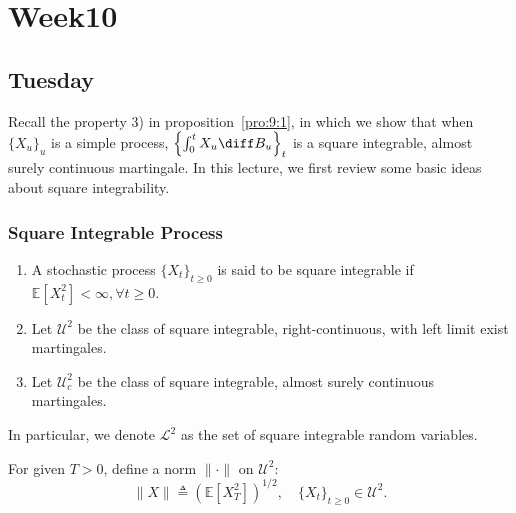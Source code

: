 
\chapter{Week10}

\section{Tuesday}

Recall the property 3) in proposition~\ref{pro:9:1}, in which we show that when $\{X_u\}_u$ is a simple process, $\left\{\int_0^tX_u\diff B_u\right\}_t$ is a square integrable, almost surely continuous martingale.
In this lecture, we first review some basic ideas about square integrability.
\subsection{Square Integrable Process}
\begin{definition}
\begin{enumerate}
\item
A stochastic process $\{X_t\}_{t\ge0}$ is said to be square integrable if 
$\mathbb{E}[X_t^2]<\infty,\forall t\ge0$.
\item
Let $\mathcal{U}^2$ be the class of square integrable, right-continuous, with left limit exist martingales.
\item
Let $\mathcal{U}_c^2$ be the class of square integrable, almost surely continuous martingales.
\end{enumerate}
\end{definition}
In particular, we denote $\mathcal{L}^2$ as the set of square integrable random variables.
\begin{definition}
For given $T>0$, define a norm $\|\cdot\|$ on $\mathcal{U}^2$:
\[
\|X\|\triangleq \left(
\mathbb{E}[X_T^2]
\right)^{1/2},\quad \{X_t\}_{t\ge0}\in\mathcal{U}^2.
\]
\end{definition}

